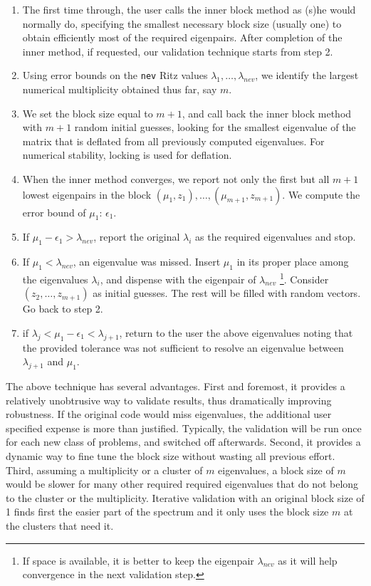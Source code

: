 \documentclass{report}
\begin{document}
\begin{enumerate}
\setlength{\itemsep}{-2pt}
\item
The first time through,
the user calls the inner block method as (s)he would normally do,
specifying the smallest necessary block size (usually one) to obtain
efficiently most of the required eigenpairs.
After completion of the inner method, if requested,
our validation technique starts from step 2.

\item
Using error bounds on the {\tt nev} Ritz values
$\lambda_1, \ldots , \lambda_{nev}$, we identify the largest
numerical multiplicity obtained thus far, say $m$.

\item
We set the block size equal to $m+1$, and call back the inner
block method with $m+1$ random initial guesses,
looking for the smallest eigenvalue of the matrix
that is deflated from all previously computed eigenvalues.
For numerical stability, locking is used for deflation.

\item
When the inner method converges, we report not only the first
but all $m+1$ lowest eigenpairs in the block
$(\mu_1, z_1), \ldots , (\mu_{m+1}, z_{m+1})$.
We compute the error bound of $\mu_1$: $\epsilon_1$.

\item
If $\mu_1 - \epsilon_1 > \lambda_{nev}$, report the original $\lambda_i$
as the required eigenvalues and stop.

\item
If $\mu_1 < \lambda_{nev}$, an eigenvalue was missed.
Insert $\mu_1$ in its proper place among the eigenvalues $\lambda_i$,
and dispense with the eigenpair of $\lambda_{nev}$
\footnote{If space is available, it is better to keep the
eigenpair $\lambda_{nev}$ as it will help convergence in the
next validation step.}.
Consider $(z_2, \ldots , z_{m+1})$ as initial guesses. The rest
will be filled with random vectors.
Go back to step 2.

\item
if $\lambda_j < \mu_1 - \epsilon_1 < \lambda_{j+1}$, return to the
user the above eigenvalues noting that the provided tolerance
was not sufficient to resolve an eigenvalue between $\lambda_{j+1}$
and $\mu_1$.

\end{enumerate}

The above technique has several advantages.
First and foremost, it provides a relatively unobtrusive way to
validate results, thus dramatically improving robustness.
If the original code would miss eigenvalues,
the additional user specified expense is more than justified.
Typically, the validation will be run once for each new class of
problems, and switched off afterwards.
Second, it provides a dynamic way to fine tune the block size without
wasting all previous effort.
Third, assuming a multiplicity or a cluster of $m$ eigenvalues,
a block size of $m$ would be slower for many other required
required eigenvalues that do not belong to the cluster or
the multiplicity.
Iterative validation with an original block size of 1 finds first
the easier part of the spectrum and it only uses the block size
$m$ at the clusters that need it.
\end{document}
